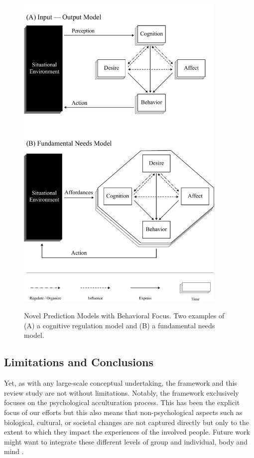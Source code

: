 \documentclass[man, 12pt, a4paper, mask]{apa7}
\begin{document}


\begin{figure}[ht!]
\centering
    \caption{Novel Prediction Models with Behavioral Focus. Two examples of (A) a cognitive regulation model and (B) a fundamental needs model.}
\includegraphics[width=0.9\textwidth]{Figures/NovelPredictionsBehaviorTime.pdf}
\label{fig:NovelModels}
\end{figure}

\subsection{Limitations and Conclusions}
Yet, as with any large-scale conceptual undertaking, the framework and this review study are not without limitations. Notably, the framework exclusively focuses on the psychological acculturation process. This has been the explicit focus of our efforts but this also means that non-psychological aspects such as biological, cultural, or societal changes are not captured directly but only to the extent to which they impact the experiences of the involved people. Future work might want to integrate these different levels of group and individual, body and mind \citep[e.g.,][]{Eronen2021}. 
\end{document}

